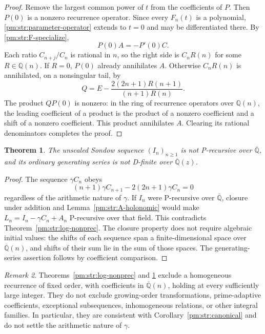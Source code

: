 \documentclass[11pt,a4paper]{article}
\newtheorem{theorem}{Theorem}[section]
\theoremstyle{definition}
\theoremstyle{remark}
\newtheorem{remark}[theorem]{Remark}
\numberwithin{equation}{section}
\begin{document}
\begin{proof}
Remove the largest common power of $t$ from the coefficients of $P$.
Then $P(0)$ is a nonzero recurrence operator.  Since every $F_n(t)$
is a polynomial, \eqref{pm:str:parameter-operator} extends to $t=0$ and
may be differentiated there.  By \eqref{pm:str:F-specialize},
\begin{equation}\label{pm:str:A-inhomogeneous}
 P(0)A=-P'(0)C.
\end{equation}
Each ratio $C_{n+j}/C_n$ is rational in $n$, so the right side is
$C_nR(n)$ for some $R\in\mathbb Q(n)$.  If $R=0$, $P(0)$ already
annihilates $A$.  Otherwise $C_nR(n)$ is annihilated, on a nonsingular
tail, by
\[
 Q=E-\frac{2(2n+1)R(n+1)}{(n+1)R(n)}.
\]
The product $QP(0)$ is nonzero: in the ring of recurrence operators
over $\mathbb Q(n)$, the leading coefficient of a product is the
product of a nonzero coefficient and a shift of a nonzero coefficient.
This product annihilates $A$.  Clearing its rational denominators
completes the proof.
\end{proof}

\begin{theorem}\label{pm:str:I-nonprec}
The unscaled Sondow sequence $(I_n)_{n\geq1}$ is not P-recursive
over $\overline{\mathbb Q}$, and its ordinary generating series is
not D-finite over $\overline{\mathbb Q}(z)$.
\end{theorem}

\begin{proof}
The sequence $\gamma C_n$ obeys
\[
 (n+1)\gamma C_{n+1}-2(2n+1)\gamma C_n=0
\]
regardless of the arithmetic nature of $\gamma$.  If $I_n$ were
P-recursive over $\overline{\mathbb Q}$, closure under addition and
Lemma~\ref{pm:str:A-holonomic} would make
$L_n=I_n-\gamma C_n+A_n$ P-recursive over that field.  This contradicts
Theorem~\ref{pm:str:log-nonprec}.  The closure property does not require
algebraic initial values: the shifts of each sequence span a
finite-dimensional space over $\overline{\mathbb Q}(n)$, and shifts
of their sum lie in the sum of those spaces.  The generating-series
assertion follows by coefficient comparison.
\end{proof}

\begin{remark}\label{pm:str:recurrence-scope}
Theorems~\ref{pm:str:log-nonprec} and \ref{pm:str:I-nonprec} exclude a
homogeneous recurrence of fixed order, with coefficients in
$\overline{\mathbb Q}(n)$, holding at every sufficiently large
integer.  They do not exclude growing-order transformations,
prime-adaptive coefficients, exceptional subsequences, inhomogeneous
relations, or other integral families.  In particular, they are
consistent with Corollary~\ref{pm:str:canonical} and do not settle the
arithmetic nature of $\gamma$.
\end{remark}
\end{document}
